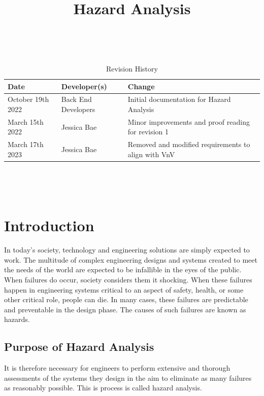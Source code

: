 \documentclass{article}
\title{Hazard Analysis\\\progname}
\author{\authname}
\date{}
\begin{document}
\maketitle
\thispagestyle{empty}

~\newpage


\begin{table}[hp]
	\caption{Revision History} \label{TblRevisionHistory}
	\begin{tabularx}{\textwidth}{llX}
		\toprule
		\textbf{Date} & \textbf{Developer(s)} & \textbf{Change}        \\
		\midrule
		October 19th 2022        & Back End Developers              & Initial documentation for Hazard Analysis \\
		March 15th 2022        & Jessica Bae & Minor improvements and proof reading for revision 1 \\
		March 17th 2023        & Jessica Bae & Removed and modified requirements to align with VnV \\
		\bottomrule
	\end{tabularx}
\end{table}

~\newpage

\tableofcontents
\listoffigures
\listoftables

~\newpage


\section{Introduction}

In today's society, technology and engineering solutions are simply expected to work. The multitude of complex engineering designs and systems created to meet the needs of the world are expected to be infallible in the eyes of the public. When failures do occur, society considers them it shocking. When these failures happen in engineering systems critical to an aspect of safety, health, or some other critical role, people can die. In many cases, these failures are predictable and preventable in the design phase. The causes of such failures are known as hazards.
\subsection{Purpose of Hazard Analysis}

It is therefore necessary for engineers to perform extensive and thorough assessments of the systems they design in the aim to eliminate as many failures as reasonably possible. This is process is called hazard analysis.\\
\end{document}
